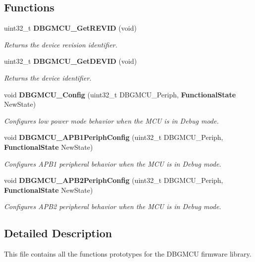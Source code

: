 \subsection*{Functions}
\begin{DoxyCompactItemize}
\item 
uint32\+\_\+t \textbf{ D\+B\+G\+M\+C\+U\+\_\+\+Get\+R\+E\+V\+ID} (void)
\begin{DoxyCompactList}\small\item\em Returns the device revision identifier. \end{DoxyCompactList}\item 
uint32\+\_\+t \textbf{ D\+B\+G\+M\+C\+U\+\_\+\+Get\+D\+E\+V\+ID} (void)
\begin{DoxyCompactList}\small\item\em Returns the device identifier. \end{DoxyCompactList}\item 
void \textbf{ D\+B\+G\+M\+C\+U\+\_\+\+Config} (uint32\+\_\+t D\+B\+G\+M\+C\+U\+\_\+\+Periph, \textbf{ Functional\+State} New\+State)
\begin{DoxyCompactList}\small\item\em Configures low power mode behavior when the M\+CU is in Debug mode. \end{DoxyCompactList}\item 
void \textbf{ D\+B\+G\+M\+C\+U\+\_\+\+A\+P\+B1\+Periph\+Config} (uint32\+\_\+t D\+B\+G\+M\+C\+U\+\_\+\+Periph, \textbf{ Functional\+State} New\+State)
\begin{DoxyCompactList}\small\item\em Configures A\+P\+B1 peripheral behavior when the M\+CU is in Debug mode. \end{DoxyCompactList}\item 
void \textbf{ D\+B\+G\+M\+C\+U\+\_\+\+A\+P\+B2\+Periph\+Config} (uint32\+\_\+t D\+B\+G\+M\+C\+U\+\_\+\+Periph, \textbf{ Functional\+State} New\+State)
\begin{DoxyCompactList}\small\item\em Configures A\+P\+B2 peripheral behavior when the M\+CU is in Debug mode. \end{DoxyCompactList}\end{DoxyCompactItemize}


\subsection{Detailed Description}
This file contains all the functions prototypes for the D\+B\+G\+M\+CU firmware library. 

